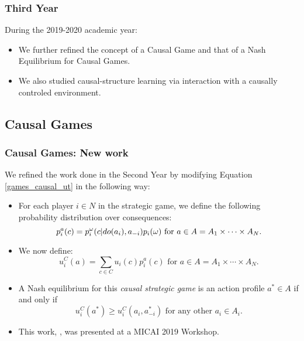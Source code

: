\documentclass{beamer}
\theoremstyle{plain}
\begin{document}
\begin{frame}
\frametitle{Third Year}
During the 2019-2020 academic year:
\begin{itemize}
\item We further refined the concept of a Causal Game and that of a Nash Equilibrium for Causal Games.
\item We also studied causal-structure learning via interaction with a causally controled environment.
\end{itemize}
\end{frame}

\subsection{Causal Games}
\begin{frame}
\frametitle{Causal Games: New work}
We refined the work done in the Second Year by modifying Equation \ref{games_causal_ut} in the following way:
\begin{itemize}
\item For each player $i \in N$ in the strategic game, we define the following probability distribution over consequences:
\begin{equation}{\label{causal_utility}}
p^a_i (c) =  p^\omega_i (c | do(a_i), a_{-i}) p_i(\omega)\textrm{ for } a \in A=A_1 \times \cdots \times A_N.
\end{equation}
\item We now define:
\begin{equation}
u^C_i (a) = \sum_{c \in C}  u_i(c) p^a_i (c) \textrm{ for } a \in A=A_1 \times \cdots \times A_N.
\end{equation}
\item A Nash equilibrium for this \textit{causal strategic game} is an action profile $a^\ast \in A$ if and only if
\begin{equation}
 u^C_i(a^\ast) \geq u^C_i(a_i, a^\ast_{-i}) \textrm{ for any other } a_i \in A_i. 
 \end{equation}
\item This work, \cite{gonzalez2019games}, was presented at a MICAI 2019 Workshop.
\end{itemize}
\end{frame}
\end{document}
